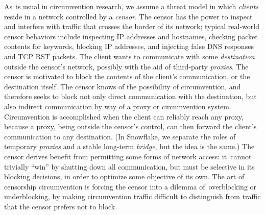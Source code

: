 \documentclass[letterpaper,twocolumn]{article}
\newcommand{\firstterm}[1]{\textit{#1}}
\begin{document}
As~is usual in circumvention research,
we assume a threat model in which
\firstterm{clients} reside in a network
controlled by a \firstterm{censor}.
The censor has the power to inspect and interfere with
traffic that crosses the border of its network;
typical real-world censor behaviors include
inspecting IP addresses and hostnames,
checking packet contents for keywords,
blocking IP addresses, and injecting false DNS responses
and TCP RST packets.
The client wants to communicate with some
\firstterm{destination} outside the censor's network,
possibly with the aid of third-party \firstterm{proxies}.
The censor is motivated to block the contents
of the client's communication, or the destination itself.
The censor knows of the possibility of circumvention,
and therefore seeks to block not only direct communication with the destination,
but also indirect communication by way of a proxy or circumvention system.
Circumvention is accomplished when the client
can reliably reach any proxy,
because a proxy, being outside the censor's control,
can then forward the client's communication to any destination.
(In Snowflake, we separate the roles of temporary \firstterm{proxies}
and a stable long-term \firstterm{bridge}, but the idea is the same.)
The censor derives benefit
from permitting some forms of network access:
it~cannot trivially ``win''
by shutting down all communication,
but must be selective in its blocking decisions,
in order to optimize some objective of its own.
The art of censorship circumvention is
forcing the censor into a dilemma
of~overblocking or underblocking,
by making circumvention traffic difficult to distinguish
from traffic that the censor prefers not to block.
\end{document}
